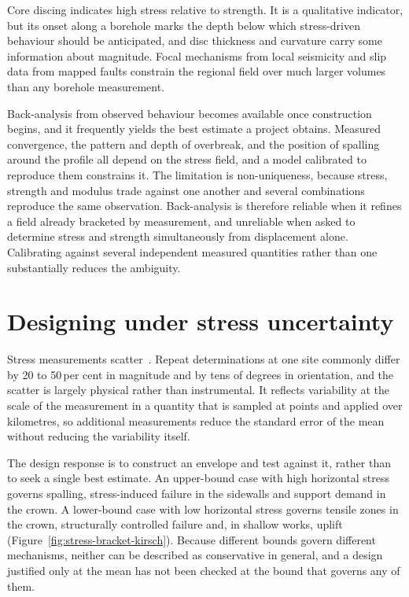 Core discing indicates high stress relative to strength. It is a qualitative
indicator, but its onset along a borehole marks the depth below which
stress-driven behaviour should be anticipated, and disc thickness and
curvature carry some information about magnitude. Focal mechanisms from local
seismicity and slip data from mapped faults constrain the regional field over
much larger volumes than any borehole measurement.

Back-analysis from observed behaviour becomes available once construction
begins, and it frequently yields the best estimate a project obtains.
Measured convergence, the pattern and depth of overbreak, and the position of
spalling around the profile all depend on the stress field, and a model
calibrated to reproduce them constrains it. The limitation is non-uniqueness, because
stress, strength and modulus trade against one another and several
combinations reproduce the same observation. Back-analysis is therefore
reliable when it refines a field already bracketed by measurement, and
unreliable when asked to determine stress and strength simultaneously from
displacement alone. Calibrating against several independent measured
quantities rather than one substantially reduces the ambiguity.

\section{Designing under stress uncertainty}
\label{sec:stress-uncertainty}

Stress measurements scatter~\citep{amadei1997stress}. Repeat determinations at
one site commonly differ by 20 to 50\,per cent in magnitude and by tens of
degrees in orientation, and
the scatter is largely physical rather than instrumental. It reflects
variability at the scale of the measurement in a quantity that is sampled at
points and applied over kilometres, so additional measurements reduce the
standard error of the mean without reducing the variability itself.

The design response is to construct an envelope and test against it, rather
than to seek a single best estimate. An upper-bound case with high horizontal stress
governs spalling, stress-induced failure in the sidewalls and support demand
in the crown. A lower-bound case with low horizontal stress governs tensile
zones in the crown, structurally controlled failure and, in shallow works,
uplift (Figure~\ref{fig:stress-bracket-kirsch}). Because different bounds
govern different mechanisms, neither can be
described as conservative in general, and a design justified only at the mean
has not been checked at the bound that governs any of them.

